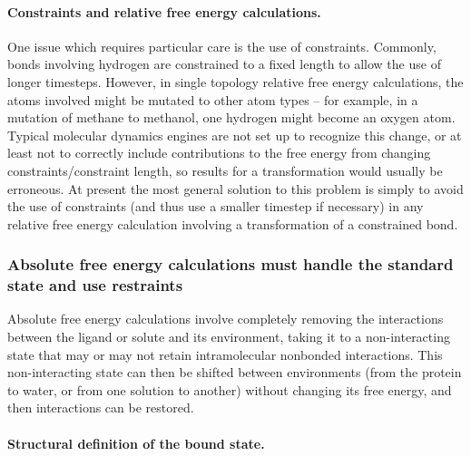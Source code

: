 \documentclass[9pt,bestpractices]{livecoms}
\begin{document}
\paragraph{Constraints and relative free energy calculations.}
One issue which requires particular care is the use of constraints.
Commonly, bonds involving hydrogen are constrained to a fixed length to allow the use of longer timesteps.
However, in single topology relative free energy calculations, the atoms involved might be mutated to other atom types -- for example, in a mutation of methane to methanol, one hydrogen might become an oxygen atom.
Typical molecular dynamics engines are not set up to recognize this change, or at least not to correctly include contributions to the free energy from changing constraints/constraint length, so results for a transformation would usually be erroneous.
At present the most general solution to this problem is simply to avoid the use of constraints (and thus use a smaller timestep if necessary) in any relative free energy calculation involving a transformation of a constrained bond.

\subsubsection{Absolute free energy calculations must handle the standard state and use restraints}



Absolute free energy calculations involve completely removing the interactions between the ligand or solute and its environment, taking it to a non-interacting state that may or may not retain intramolecular nonbonded interactions.
This non-interacting state can then be shifted between environments (from the protein to water, or from one solution to another) without changing its free energy, and then interactions can be restored.

\paragraph{Structural definition of the bound state.}
\end{document}
